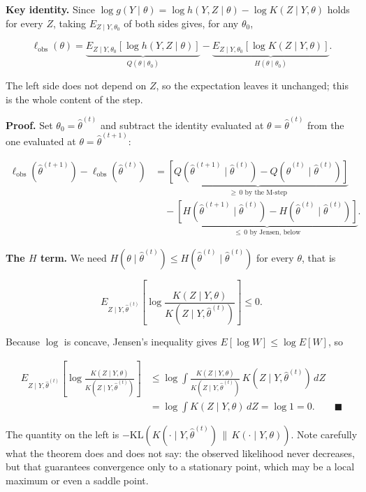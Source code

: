 \documentclass[
  letterpaper,
  DIV=11,
  numbers=noendperiod]{scrreprt}
\begin{document}
\textbf{Key identity.} Since
\(\log g(Y \mid \theta) = \log h(Y, Z \mid \theta) - \log K(Z \mid Y, \theta)\)
holds for every \(Z\), taking \(E_{Z \mid Y, \theta_0}\) of both sides
gives, for any \(\theta_0\),

\[
\ell_{\text{obs}}(\theta)
= \underbrace{E_{Z \mid Y, \theta_0}\!\left[\log h(Y, Z \mid \theta)\right]}_{Q(\theta \mid \theta_0)}
- \underbrace{E_{Z \mid Y, \theta_0}\!\left[\log K(Z \mid Y, \theta)\right]}_{H(\theta \mid \theta_0)} .
\]

The left side does not depend on \(Z\), so the expectation leaves it
unchanged; this is the whole content of the step.

\textbf{Proof.} Set \(\theta_0 = \hat\theta^{(t)}\) and subtract the
identity evaluated at \(\theta = \hat\theta^{(t)}\) from the one
evaluated at \(\theta = \hat\theta^{(t+1)}\):

\[
\begin{aligned}
\ell_{\text{obs}}\!\left(\hat\theta^{(t+1)}\right) - \ell_{\text{obs}}\!\left(\hat\theta^{(t)}\right)
&= \underbrace{\left[Q\!\left(\hat\theta^{(t+1)} \mid \hat\theta^{(t)}\right) - Q\!\left(\hat\theta^{(t)} \mid \hat\theta^{(t)}\right)\right]}_{\ge\, 0 \text{ by the M-step}} \\
&\quad - \underbrace{\left[H\!\left(\hat\theta^{(t+1)} \mid \hat\theta^{(t)}\right) - H\!\left(\hat\theta^{(t)} \mid \hat\theta^{(t)}\right)\right]}_{\le\, 0 \text{ by Jensen, below}} .
\end{aligned}
\]

\textbf{The \(H\) term.} We need
\(H(\theta \mid \hat\theta^{(t)}) \le H(\hat\theta^{(t)} \mid \hat\theta^{(t)})\)
for every \(\theta\), that is

\[
E_{Z \mid Y, \hat\theta^{(t)}}\!\left[\log \frac{K(Z \mid Y, \theta)}{K(Z \mid Y, \hat\theta^{(t)})}\right] \le 0 .
\]

Because \(\log\) is concave, Jensen's inequality gives
\(E[\log W] \le \log E[W]\), so

\[
\begin{aligned}
E_{Z \mid Y, \hat\theta^{(t)}}\!\left[\log \frac{K(Z \mid Y, \theta)}{K(Z \mid Y, \hat\theta^{(t)})}\right]
&\le \log \int \frac{K(Z \mid Y, \theta)}{K(Z \mid Y, \hat\theta^{(t)})} \, K(Z \mid Y, \hat\theta^{(t)}) \, dZ \\
&= \log \int K(Z \mid Y, \theta) \, dZ = \log 1 = 0 . \qquad \blacksquare
\end{aligned}
\]

The quantity on the left is
\(-\mathrm{KL}\!\left(K(\cdot \mid Y, \hat\theta^{(t)}) \,\|\, K(\cdot \mid Y, \theta)\right)\).
Note carefully what the theorem does and does not say: the observed
likelihood never decreases, but that guarantees convergence only to a
stationary point, which may be a local maximum or even a saddle point.
\end{document}
